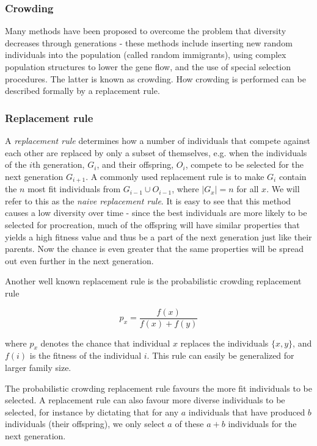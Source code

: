 \subsubsection{Crowding}
Many methods have been proposed to overcome the problem that diversity decreases through generations - these methods include inserting new random individuals into the population (called random immigrants), using complex population structures to lower the gene flow, and the use of special selection procedures\cite{ursem2002diversity}. The latter is known as crowding. 
How crowding is performed can be described formally by a replacement rule.

\subsubsection{Replacement rule}
A \emph{replacement rule} determines how a number of individuals that compete against each other are replaced by only a subset of themselves, e.g. when the individuals of the $i$th generation, $G_i$, and their offspring, $O_i$, compete to be selected for the next generation $G_{i+1}$.
A commonly used replacement rule is to make $G_i$ contain the $n$ most fit individuals from $G_{i-1} \cup O_{i-1}$, where $|G_x| = n$ for all $x$\cite{masterThesisGANN}. We will refer to this as the \emph{naive replacement rule}.
It is easy to see that this method causes a low diversity over time - since the best individuals are more likely to be selected for procreation, much of the offspring will have similar properties that yields a high fitness value and thus be a part of the next generation just like their parents. Now the chance is even greater that the same properties will be spread out even further in the next generation.

Another well known replacement rule is the probabilistic crowding replacement rule\cite{Mengshoel_and_Goldberg:1999}

\[p_x = \frac{f(x)}{f(x)+f(y)}\]

where $p_x$ denotes the chance that individual $x$ replaces the individuals $\{x, y\}$, and $f(i)$ is the fitness of the individual $i$. This rule can easily be generalized for larger family size. 

The probabilistic crowding replacement rule favours the more fit individuals to be selected.
A replacement rule can also favour more diverse individuals to be selected, for instance by dictating that for any $a$ individuals that have produced $b$ individuals (their offspring), we only select $a$ of these $a+b$ individuals for the next generation.

